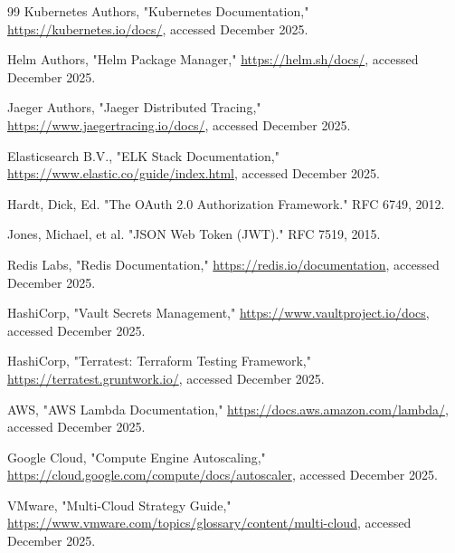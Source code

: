 \documentclass[12pt,a4paper]{report}
\begin{document}
\begin{thebibliography}{99}
 Kubernetes Authors, "Kubernetes Documentation," \url{https://kubernetes.io/docs/}, accessed December 2025.

 Helm Authors, "Helm Package Manager," \url{https://helm.sh/docs/}, accessed December 2025.

 Jaeger Authors, "Jaeger Distributed Tracing," \url{https://www.jaegertracing.io/docs/}, accessed December 2025.

 Elasticsearch B.V., "ELK Stack Documentation," \url{https://www.elastic.co/guide/index.html}, accessed December 2025.

 Hardt, Dick, Ed. "The OAuth 2.0 Authorization Framework." RFC 6749, 2012.

 Jones, Michael, et al. "JSON Web Token (JWT)." RFC 7519, 2015.

 Redis Labs, "Redis Documentation," \url{https://redis.io/documentation}, accessed December 2025.

 HashiCorp, "Vault Secrets Management," \url{https://www.vaultproject.io/docs}, accessed December 2025.

 HashiCorp, "Terratest: Terraform Testing Framework," \url{https://terratest.gruntwork.io/}, accessed December 2025.

 AWS, "AWS Lambda Documentation," \url{https://docs.aws.amazon.com/lambda/}, accessed December 2025.

 Google Cloud, "Compute Engine Autoscaling," \url{https://cloud.google.com/compute/docs/autoscaler}, accessed December 2025.

 VMware, "Multi-Cloud Strategy Guide," \url{https://www.vmware.com/topics/glossary/content/multi-cloud}, accessed December 2025.

\end{thebibliography}
\end{document}
